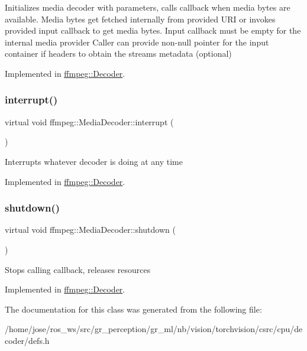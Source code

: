 Initializes media decoder with parameters, calls callback when media bytes are available. Media bytes get fetched internally from provided U\+RI or invokes provided input callback to get media bytes. Input callback must be empty for the internal media provider Caller can provide non-\/null pointer for the input container if headers to obtain the streams metadata (optional) 

Implemented in \hyperlink{classffmpeg_1_1Decoder_a05d8eb1d33e6a1e19fe92da06fc7792e}{ffmpeg\+::\+Decoder}.

\mbox{\label{classffmpeg_1_1MediaDecoder_a165ba6847844ec6057ffcb6b7379f2af}} 
\subsubsection{\texorpdfstring{interrupt()}{interrupt()}}
{\footnotesize\ttfamily virtual void ffmpeg\+::\+Media\+Decoder\+::interrupt (\begin{DoxyParamCaption}{ }\end{DoxyParamCaption})\hspace{0.3cm}{\ttfamily [pure virtual]}}

Interrupts whatever decoder is doing at any time 

Implemented in \hyperlink{classffmpeg_1_1Decoder_a4f0672cd7855e99dbdd7ceceb634d51b}{ffmpeg\+::\+Decoder}.

\mbox{\label{classffmpeg_1_1MediaDecoder_a844a205a22a365e6c8945e0a54ca7b66}} 
\subsubsection{\texorpdfstring{shutdown()}{shutdown()}}
{\footnotesize\ttfamily virtual void ffmpeg\+::\+Media\+Decoder\+::shutdown (\begin{DoxyParamCaption}{ }\end{DoxyParamCaption})\hspace{0.3cm}{\ttfamily [pure virtual]}}

Stops calling callback, releases resources 

Implemented in \hyperlink{classffmpeg_1_1Decoder_a1838e1a5548671a7b19426bff8ff9b3c}{ffmpeg\+::\+Decoder}.



The documentation for this class was generated from the following file\+:\begin{DoxyCompactItemize}
\item 
/home/jose/ros\+\_\+ws/src/gr\+\_\+perception/gr\+\_\+ml/nb/vision/torchvision/csrc/cpu/decoder/defs.\+h\end{DoxyCompactItemize}
